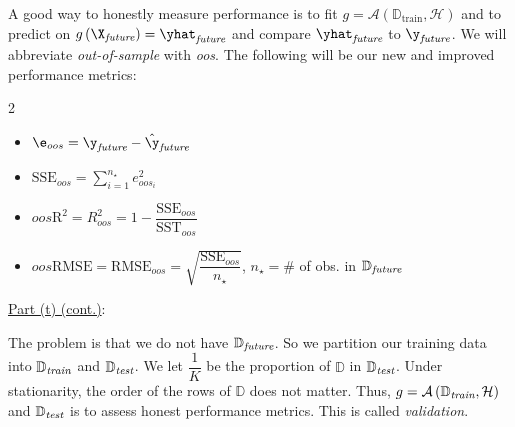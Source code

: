 \documentclass[12pt]{article}
\begin{document}
\begin{enumerate}

\begin{tcolorbox}[colback = white, sharp corners]
A good way to honestly measure performance is to fit $g = \mathcal{A}\left(\mathbb{D}_{\text{train}} , \mathcal{H}\right)$ and to predict on $g\left( \X_{\emph{future}} \right) = \yhat_{\emph{future}}$ and compare $\yhat_{\emph{future}}$ to $\y_{\emph{future}}$. We will abbreviate \emph{out-of-sample} with \emph{oos}. The following will be our new and improved performance metrics:

\begin{multicols}{2}
\begin{itemize}
\item $\e_{oos} = \y_{\emph{future}} - \hat{\y}_{\emph{future}}$
\item $\displaystyle\text{SSE}_{oos} = \sum_{i=1}^{n_{\star}} e_{{oos}_i}^2$
\item $oos\text{R}^2 = R_{oos}^2 = 1 - \dfrac{\text{SSE}_{oos}}{\text{SST}_{oos}}$
\item $oos\text{RMSE} = \text{RMSE}_{oos} = \sqrt{\dfrac{\text{SSE}_{oos}}{n_{\star}}}$, $n_{\star} = \#$ of obs. in $\mathbb{D}_{\emph{future}}$
\end{itemize}
\end{multicols}

\end{tcolorbox}

\newpage

\begin{tcolorbox}[colback=white, sharp corners]
\underline{Part (t) (cont.)}:

The problem is that we do not have $\mathbb{D}_{\emph{future}}$. So we partition our training data into $\mathbb{D}_{\emph{train}}$ and $\mathbb{D}_{\emph{test}}$. We let $\dfrac{1}{K}$ be the proportion of $\mathbb{D}$ in $\mathbb{D}_{\emph{test}}$. Under stationarity, the order of the rows of $\mathbb{D}$ does not matter. Thus, $g = \mathcal{A}\left( \mathbb{D}_{\emph{train}}, \mathcal{H} \right)$ and $\mathbb{D}_{\emph{test}}$ is to assess honest performance metrics. This is called \emph{validation}.


\end{tcolorbox}
\end{enumerate}
\end{document}
